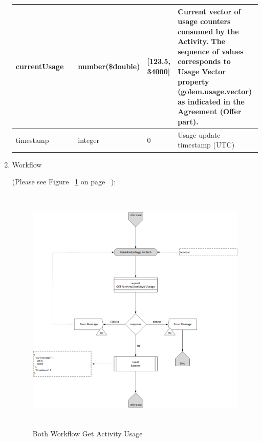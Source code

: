 \begin{enumerate}
\begin{table}[H]
\begin{center}
\begin{tabular}{|p{3cm}|l|p{3cm}|p{3cm}|p{4cm}|}
currentUsage		&	&	number(\$double)		& [123.5, 34000]	&	Current vector of usage counters consumed by the Activity. 
																			The sequence of values corresponds to Usage Vector property 
																			(golem.usage.vector) as indicated in the Agreement (Offer part).\\
\hline  

timestamp			&	&	integer	&	0	&	Usage update timestamp (UTC) \\
\hline
 
\end{tabular}
\end{center}
\end{table}

\item Workflow

(Please see Figure ~\ref{fig:BGAU} on page ~\pageref{fig:BGAU}):

\begin{figure}[H]
    \centering
    \includegraphics[width=12cm,height=12cm,angle=0]{./diag/Workflow/Activity/GetActivityUsage-B-Workflow.png}
    \caption{Both Workflow Get Activity Usage }
	\label{fig:BGAU}
\end{figure}


\end{enumerate}

\newpage



